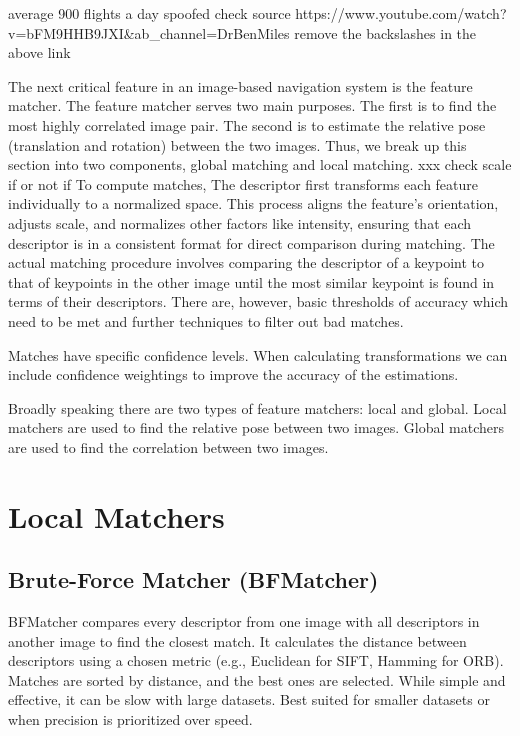 average 900 flights a day spoofed check source
https://www.youtube.com/watch?v=bFM9HHB9JXI\&ab\_channel=DrBenMiles
remove the backslashes in the above link





The next critical feature in an image-based navigation system is the feature matcher. The feature matcher serves two main purposes. The first is to find the most highly correlated image pair. The second is to estimate the relative pose (translation and rotation) between the two images. Thus, we break up this section into two components, global matching and local matching. 
xxx check scale if or not if
To compute matches, The descriptor first transforms each feature individually to a normalized space. This process aligns the feature’s orientation, adjusts scale, and normalizes other factors like intensity, ensuring that each descriptor is in a consistent format for direct comparison during matching. The actual matching procedure involves comparing the descriptor of a keypoint to that of keypoints in the other image until the most similar keypoint is found in terms of their descriptors. There are, however, basic thresholds of accuracy which need to be met and further techniques to filter out bad matches. 


Matches have specific confidence levels. When calculating transformations we can include confidence weightings to improve the accuracy of the estimations. 

Broadly speaking there are two types of feature matchers: local and global. Local matchers are used to find the relative pose between two images. Global matchers are used to find the correlation between two images.

\section*{Local Matchers}
\subsection*{Brute-Force Matcher (BFMatcher)} BFMatcher compares every descriptor from one image with all descriptors in another image to find the closest match. It calculates the distance between descriptors using a chosen metric (e.g., Euclidean for SIFT, Hamming for ORB). Matches are sorted by distance, and the best ones are selected. While simple and effective, it can be slow with large datasets. Best suited for smaller datasets or when precision is prioritized over speed.

